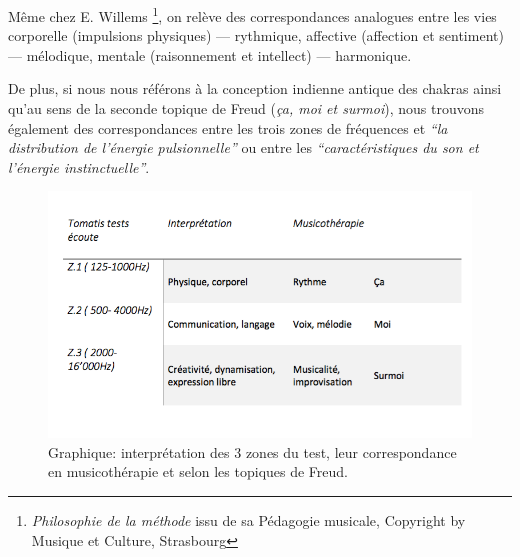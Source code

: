                            Même chez E. Willems \autocite{willems} \footnote{\textit{Philosophie de la méthode} issu de sa
                            Pédagogie musicale, Copyright by Musique et Culture, Strasbourg}, on relève des correspondances analogues entre les vies
                            corporelle (impulsions physiques)
                            --- rythmique, affective (affection et sentiment) --- mélodique, mentale
                            (raisonnement et intellect) --- harmonique.


                            De plus, si nous nous référons à la conception indienne antique des chakras
                            ainsi qu'au sens de la seconde
                            topique de Freud (\textit{ça, moi et surmoi}), nous trouvons également des correspondances
                            entre les trois zones de
                            fréquences et \textit       {``la distribution de l'énergie pulsionnelle''} ou entre
                            les
                            \textit{``caractéristiques du son et l'énergie
                            instinctuelle''}\autocite[ch. 13]{auriol_cle_1996}.

                            \begin{figure}
                            	\centering
                            	\includegraphics[width=1.1\linewidth]{images/testinterpmusico}
                            	\caption[ L'interprétation des 3 zones et leur correspondance
                                    en musicothérapie]{Graphique: interprétation des 3 zones du
                                      test, leur correspondance en musicothérapie et selon les
                                      topiques de Freud.}

                            	\label{graphiquecolonnetestmusico}
                                  \end{figure}




